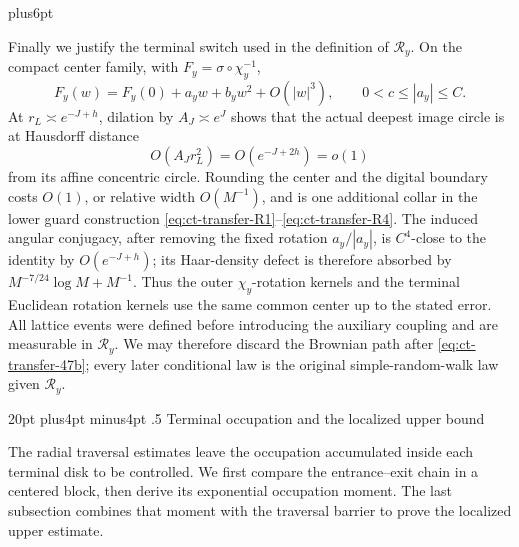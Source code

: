 \documentclass[12pt,reqno]{amsart}
\makeatletter
\def\section{\@startsection{section}{1}{0pt}%
  {20pt plus4pt minus4pt}
  {.5\linespacing}
  {\normalfont\bfseries}}
\theoremstyle{plain}
\theoremstyle{definition}
\theoremstyle{remark}
\renewenvironment{proof}[1][\proofname]{%
  \par
  \pushQED{\qed}%
  \normalfont
  \topsep6pt plus6pt\relax
  \trivlist
  \item[\hskip\labelsep\slshape #1\@addpunct{.}]%
  \ignorespaces
}{%
  \popQED
  \endtrivlist
  \@endpefalse
}
\DeclareRobustCommand{\qed}{%
  \leavevmode\unskip\penalty9999\hbox{}\nobreak
  \ifmmode
    \makebox[0pt][l]{\qquad\hbox{\qedsymbol}}%
  \else
    \qquad\hbox{\qedsymbol}%
  \fi
}
\renewcommand{\qedsymbol}{\rule[.47pt]{4pt}{6pt}}
\numberwithin{equation}{section}
\makeatother
\begin{document}
\begin{proof}[Proof of Lemma~\ref{lem:buffered-transfer}]
Finally we justify the terminal switch used in the definition of
$\mathcal{R}_y$.  On the compact center family, with
$F_y=\sigma\circ\chi_y^{-1}$,
\[
F_y(w)=F_y(0)+a_yw+b_yw^2+O(|w|^3),
       \qquad0<c\le|a_y|\le C.
\]
At $r_L\asymp e^{-J+h}$, dilation by $A_J\asymp e^J$ shows that
the actual deepest image circle is at Hausdorff distance
\begin{equation}
O(A_Jr_L^2)=O(e^{-J+2h})=o(1)\label{eq:ct-transfer-47c}
\end{equation}
from its affine concentric circle.  Rounding the center and the digital
boundary costs $O(1)$, or relative width $O(M^{-1})$, and is one
additional collar in the lower guard construction \eqref{eq:ct-transfer-R1}--\eqref{eq:ct-transfer-R4}.  The induced
angular conjugacy, after removing the fixed rotation
$a_y/|a_y|$, is $C^4$-close to the identity by
$O(e^{-J+h})$; its Haar-density defect is therefore absorbed by
$M^{-7/24}\log M+M^{-1}$.  Thus the outer $\chi_y$-rotation kernels
and the terminal Euclidean rotation kernels use the same common center
up to the stated error.  All lattice
events were defined before introducing the auxiliary coupling and are
measurable in $\mathcal{R}_y$.  We may therefore discard the Brownian
path after \eqref{eq:ct-transfer-47b}; every later conditional law is the original
simple-random-walk law given $\mathcal{R}_y$.
\end{proof}


\section{Terminal occupation and the localized upper bound}
\label{sec:terminal-upper}

The radial traversal estimates leave the occupation accumulated inside each terminal disk to be controlled. We first compare the entrance--exit chain in a centered block, then derive its exponential occupation moment. The last subsection combines that moment with the traversal barrier to prove the localized upper estimate.
\end{document}
